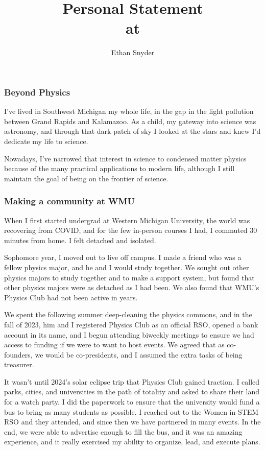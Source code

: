 \documentclass[11pt]{article}
\title{Personal Statement\\
	\large \dept{} at \school{}}
\author{Ethan Snyder}
\date{}
\begin{document}
\maketitle
\subsubsection*{Beyond Physics}
I've lived in Southwest Michigan my whole life, in the gap in the light pollution between Grand Rapids and Kalamazoo. As a child, my gateway into science was astronomy, and through that dark patch of sky I looked at the stars and knew I'd dedicate my life to science.

Nowadays, I've narrowed that interest in science to condensed matter physics because of the many practical applications to modern life, although I still maintain the goal of being on the frontier of science.

\subsubsection*{Making a community at WMU}
When I first started undergrad at Western Michigan University, the world was recovering from COVID, and for the few in-person courses I had, I commuted 30 minutes from home. I felt detached and isolated.

Sophomore year, I moved out to live off campus. I made a friend who was a fellow physics major, and he and I would study together. We sought out other physics majors to study together and to make a support system, but found that other physics majors were as detached as I had been. We also found that WMU's Physics Club had not been active in years.

We spent the following summer deep-cleaning the physics commons, and in the fall of 2023, him and I registered Physics Club as an official RSO, opened a bank account in its name, and I begun attending biweekly meetings to ensure we had access to funding if we were to want to host events. We agreed that as co-founders, we would be co-presidents, and I assumed the extra tasks of being treasurer.

It wasn't until 2024's solar eclipse trip that Physics Club gained traction. I called parks, cities, and universities in the path of totality and asked to share their land for a watch party. I did the paperwork to ensure that the university would fund a bus to bring as many students as possible. I reached out to the Women in STEM RSO and they attended, and since then we have partnered in many events. In the end, we were able to advertise enough to fill the bus, and it was an amazing experience, and it really exercised my ability to organize, lead, and execute plans.
\end{document}
